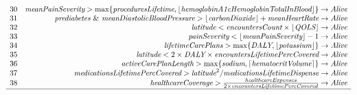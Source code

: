 \documentclass[ijds,nonblindrev]{informs-ijds}
\begin{document}
\begin{APPENDICES}
\begin{table}[!ht]
{\[\begin{array}{lr}
 30&  \textit{meanPainSeverity} > \max\{\textit{proceduresLifetime}, \lfloor \textit{hemoglobinA1cHemoglobinTotalInBlood}\rfloor\} \rightarrow \textit{Alive}  \\ 
 31&  \textit{prediabetes } \& \textit{ meanDiastolicBloodPressure} > \lfloor \textit{carbonDioxide}\rfloor + \textit{meanHeartRate} \rightarrow \textit{Alive}  \\
 32&  \textit{latitude} < \textit{encountersCount}\times \lfloor\textit{QOLS}\rfloor \rightarrow \textit{Alive}  \\ 
 33&  \textit{painSeverity} < \lfloor \textit{meanPainSeverity}\rfloor - 1 \rightarrow \textit{Alive}  \\ 
 34& \textit{lifetimeCarePlans} > \max\{\textit{DALY}, \lfloor \textit{potassium} \rfloor\} \rightarrow \textit{Alive}\\ 
 35&  \textit{latitude} < 2\times \textit{DALY}\times \textit{encountersLifetimePercCovered} \rightarrow \textit{Alive}  \\ 
 36&  \textit{activeCarePlanLength} > \max \{\textit{sodium}, \lceil \textit{hematocritVolume}\rceil\} \rightarrow \textit{Alive}  \\ 
 37&  \textit{medicationsLifetimePercCovered} > \textit{latitude}^2/\textit{medicationsLifetimeDispense} \rightarrow \textit{Alive}  \\ 
 38 & \textit{healthcareCoverage} > \frac{\textit{healthcareExpenses}}{2\times \textit{encountersLifetimePercCovered}} \rightarrow \textit{Alive}  \\ \hline
 \end{array} 
 \]
 }
 \end{table}
 
 \newpage
 

\end{APPENDICES}
\end{document}
